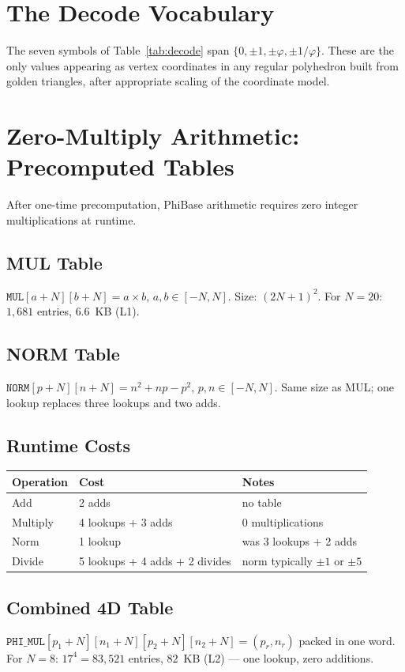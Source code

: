 \documentclass[12pt]{article}
\theoremstyle{definition}
\theoremstyle{remark}
\begin{document}
\section{The Decode Vocabulary}
The seven symbols of Table~\ref{tab:decode} span
$\{0,\pm1,\pm\varphi,\pm1/\varphi\}$.  These are the only values
appearing as vertex coordinates in any regular polyhedron built from
golden triangles, after appropriate scaling of the coordinate model.
\section{Zero-Multiply Arithmetic: Precomputed Tables}
\label{app:zeromul}
After one-time precomputation, PhiBase arithmetic requires zero integer
multiplications at runtime.
\subsection*{MUL Table}
$\mathtt{MUL}[a+N][b+N]=a\times b$, $a,b\in[-N,N]$.
Size: $(2N+1)^2$.  For $N=20$: $1{,}681$ entries, $6.6$~KB (L1).
\subsection*{NORM Table}
$\mathtt{NORM}[p+N][n+N]=n^2+np-p^2$, $p,n\in[-N,N]$.
Same size as MUL; one lookup replaces three lookups and two adds.
\subsection*{Runtime Costs}
\begin{center}
\renewcommand{\arraystretch}{1.2}
\begin{tabular}{lll}
\toprule
Operation & Cost & Notes \\
\midrule
Add    & 2 adds       & no table \\
Multiply & 4 lookups + 3 adds & 0 multiplications \\
Norm   & 1 lookup     & was 3 lookups + 2 adds \\
Divide & 5 lookups + 4 adds + 2 divides & norm typically $\pm1$ or $\pm5$ \\
\bottomrule
\end{tabular}
\end{center}
\subsection*{Combined 4D Table}
$\mathtt{PHI\_MUL}[p_1{+}N][n_1{+}N][p_2{+}N][n_2{+}N]=(p_r,n_r)$
packed in one word.  For $N=8$: $17^4=83{,}521$ entries, $82$~KB
(L2) --- one lookup, zero additions.
\end{document}
